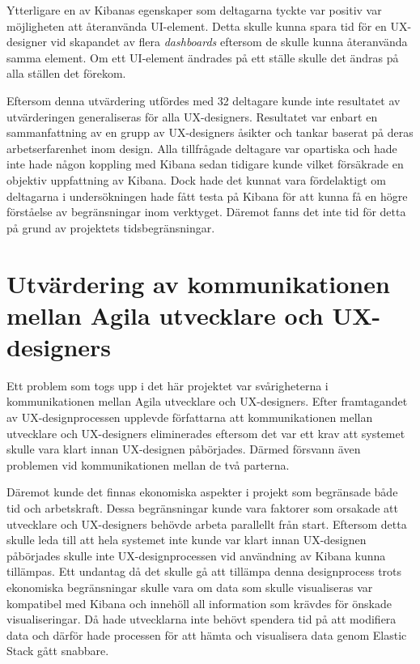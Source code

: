 \documentclass[12pt]{kththesis}
\begin{document}
Ytterligare en av Kibanas egenskaper som deltagarna tyckte var positiv var möjligheten att återanvända UI-element. Detta skulle kunna spara tid för en UX-designer vid skapandet av flera \textit{dashboards} eftersom de skulle kunna återanvända samma element. Om ett UI-element ändrades på ett ställe skulle det ändras på alla ställen det förekom.

Eftersom denna utvärdering utfördes med 32 deltagare kunde inte resultatet av utvärderingen generaliseras för alla UX-designers. Resultatet var enbart en sammanfattning av en grupp av UX-designers åsikter och tankar baserat på deras arbetserfarenhet inom design. Alla tillfrågade deltagare var opartiska och hade inte hade någon koppling med Kibana sedan tidigare kunde vilket försäkrade en objektiv uppfattning av Kibana. Dock hade det kunnat vara fördelaktigt om deltagarna i undersökningen hade fått testa på Kibana för att kunna få en högre förståelse av begränsningar inom verktyget. Däremot fanns det inte tid för detta på grund av projektets tidsbegränsningar. 

\section{Utvärdering av kommunikationen mellan Agila utvecklare och UX-designers}
Ett problem som togs upp i det här projektet var svårigheterna i kommunikationen mellan Agila utvecklare och UX-designers. Efter framtagandet av UX-designprocessen upplevde författarna att kommunikationen mellan utvecklare och UX-designers eliminerades eftersom det var ett krav att systemet skulle vara klart innan UX-designen påbörjades. Därmed försvann även problemen vid kommunikationen mellan de två parterna. 

Däremot kunde det finnas ekonomiska aspekter i projekt som begränsade både tid och arbetskraft. Dessa begränsningar kunde vara faktorer som orsakade att utvecklare och UX-designers behövde arbeta parallellt från start. Eftersom detta skulle leda till att hela systemet inte kunde var klart innan UX-designen påbörjades skulle inte UX-designprocessen vid användning av Kibana kunna tillämpas. Ett undantag då det skulle gå att tillämpa denna designprocess trots ekonomiska begränsningar skulle vara om data som skulle visualiseras var kompatibel med Kibana och innehöll all information som krävdes för önskade visualiseringar. Då hade utvecklarna inte behövt spendera tid på att modifiera data och därför hade processen för att hämta och visualisera data genom Elastic Stack gått snabbare.
\end{document}
